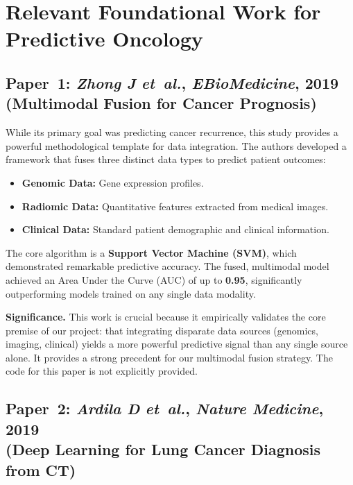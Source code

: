 \documentclass[11pt,a4paper]{article}
\begin{document}
\section*{Relevant Foundational Work for Predictive Oncology}

\subsection*{Paper~1: \textit{Zhong J} \textit{et~al.}, \textit{EBioMedicine}, 2019\\(Multimodal Fusion for Cancer Prognosis)}

While its primary goal was predicting cancer recurrence, this study provides a powerful methodological template for data integration.\cite{Zhong2019} The authors developed a framework that fuses three distinct data types to predict patient outcomes:

\begin{itemize}[itemsep=2pt]
  \item \textbf{Genomic Data:} Gene expression profiles.
  \item \textbf{Radiomic Data:} Quantitative features extracted from medical images.
  \item \textbf{Clinical Data:} Standard patient demographic and clinical information.
\end{itemize}

The core algorithm is a \textbf{Support Vector Machine (SVM)}, which demonstrated remarkable predictive accuracy. The fused, multimodal model achieved an Area Under the Curve (AUC) of up to \textbf{0.95}, significantly outperforming models trained on any single data modality.

\textbf{Significance.}
This work is crucial because it empirically validates the core premise of our project: that integrating disparate data sources (genomics, imaging, clinical) yields a more powerful predictive signal than any single source alone. It provides a strong precedent for our multimodal fusion strategy. The code for this paper is not explicitly provided.

\subsection*{Paper~2: \textit{Ardila D} \textit{et~al.}, \textit{Nature Medicine}, 2019\\(Deep Learning for Lung Cancer Diagnosis from CT)}
\end{document}
